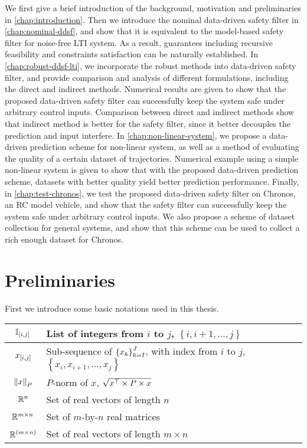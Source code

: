 We first give a brief introduction of the background, motivation and preliminaries in \cref{chap:introduction}.
Then we introduce the nominal data-driven safety filter in \cref{chap:nominal-ddsf}, and show that it is equivalent to the model-based safety filter for noise-free LTI system.
As a result, guarantees including recursive feasibility and constraints satisfaction can be naturally established.
In \cref{chap:robust-ddsf-lti}, we incorporate the robust methods into data-driven safety filter, and provide comparison and analysis of different formulations, including the direct and indirect methods.
Numerical results are given to show that the proposed data-driven safety filter can successfully keep the system safe under arbitrary control inputs.
Comparison between direct and indirect methods show that indirect method is better for the safety filter, since it better decouples the prediction and input interfere.
In \cref{chap:non-linear-system}, we propose a data-driven prediction scheme for non-linear system, as well as a method of evaluating the quality of a certain dataset of trajectories.
Numerical example using a simple non-linear system is given to show that with the proposed data-driven prediction scheme, datasets with better quality yield better prediction performance.
Finally, in \cref{chap:test-chronos}, we test the proposed data-driven safety filter on Chronos, an RC model vehicle, and show that the safety filter can successfully keep the system safe under arbitrary control inputs.
We also propose a scheme of dataset collection for general systems, and show that this scheme can be used to collect a rich enough dataset for Chronos.


\section{Preliminaries}\label{sec:preliminaries}

First we introduce some basic notations used in this thesis.

{\renewcommand{\arraystretch}{1.5}%
\begin{center}
\begin{tabular}{ c|l }
    $\mathbb{I}_{\left[ i, j \right]}$ & List of integers from $i$ to $j$, $\left\{ i, i+1, \dots, j \right\}$ \\
    \hline
    $x_{\left[ i, j \right]}$ & Sub-sequence of $\left\{x_k\right\}_{k=I}^{J}$, with index from $i$ to $j$, $\left\{ x_i, x_{i+1}, \dots, x_j \right\}$ \\
    \hline
    $\norm{x}_P$ & $P$-norm of $x$, $\sqrt{x^{\top} \times P \times x}$ \\
    \hline
    $\mathbb{R}^n$ & Set of real vectors of length $n$ \\
    \hline
    $\mathbb{R}^{m \times n}$ & Set of $m$-by-$n$ real matrices \\
    \hline
    $\mathbb{R}^{(m \times n)}$ & Set of real vectors of length $m \times n$ \\
\end{tabular}
\end{center}
}

